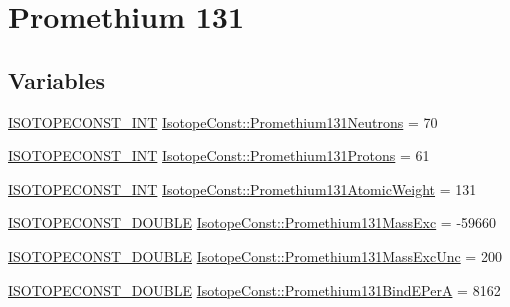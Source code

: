 \hypertarget{group___isotope_const-_promethium-_pm131}{}\section{Promethium 131}
\label{group___isotope_const-_promethium-_pm131}
\subsection*{Variables}
\begin{DoxyCompactItemize}
\item 
\mbox{\hyperlink{group___isotope_const-_macros_ga5f18360b3e99483a35c32d789e62621c}{I\+S\+O\+T\+O\+P\+E\+C\+O\+N\+S\+T\+\_\+\+I\+NT}} \mbox{\hyperlink{group___isotope_const-_promethium-_pm131_ga0242a8335164b2d355c293905c3943db}{Isotope\+Const\+::\+Promethium131\+Neutrons}} = 70
\item 
\mbox{\hyperlink{group___isotope_const-_macros_ga5f18360b3e99483a35c32d789e62621c}{I\+S\+O\+T\+O\+P\+E\+C\+O\+N\+S\+T\+\_\+\+I\+NT}} \mbox{\hyperlink{group___isotope_const-_promethium-_pm131_gadc130f65ae750d5a501b772200443f53}{Isotope\+Const\+::\+Promethium131\+Protons}} = 61
\item 
\mbox{\hyperlink{group___isotope_const-_macros_ga5f18360b3e99483a35c32d789e62621c}{I\+S\+O\+T\+O\+P\+E\+C\+O\+N\+S\+T\+\_\+\+I\+NT}} \mbox{\hyperlink{group___isotope_const-_promethium-_pm131_ga9905cd563902644bc898c0c083554215}{Isotope\+Const\+::\+Promethium131\+Atomic\+Weight}} = 131
\item 
\mbox{\hyperlink{group___isotope_const-_macros_ga8f45a7272ce02c0b4c65c44636ed719a}{I\+S\+O\+T\+O\+P\+E\+C\+O\+N\+S\+T\+\_\+\+D\+O\+U\+B\+LE}} \mbox{\hyperlink{group___isotope_const-_promethium-_pm131_gaf1cce7782012be5a6ee1b91eb11e5c26}{Isotope\+Const\+::\+Promethium131\+Mass\+Exc}} = -\/59660
\item 
\mbox{\hyperlink{group___isotope_const-_macros_ga8f45a7272ce02c0b4c65c44636ed719a}{I\+S\+O\+T\+O\+P\+E\+C\+O\+N\+S\+T\+\_\+\+D\+O\+U\+B\+LE}} \mbox{\hyperlink{group___isotope_const-_promethium-_pm131_ga6b3493e8a29763941452927a73f36a99}{Isotope\+Const\+::\+Promethium131\+Mass\+Exc\+Unc}} = 200
\item 
\mbox{\hyperlink{group___isotope_const-_macros_ga8f45a7272ce02c0b4c65c44636ed719a}{I\+S\+O\+T\+O\+P\+E\+C\+O\+N\+S\+T\+\_\+\+D\+O\+U\+B\+LE}} \mbox{\hyperlink{group___isotope_const-_promethium-_pm131_gac0632aecb368f5ff25d65caf24cecba6}{Isotope\+Const\+::\+Promethium131\+Bind\+E\+PerA}} = 8162
\item 

\end{DoxyCompactItemize}
